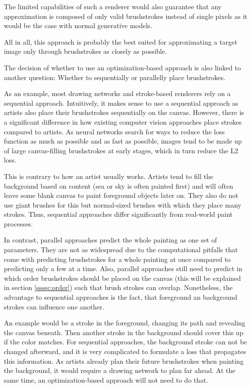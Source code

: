 The limited capabilities of such a renderer would also guarantee that any approximation is composed of only valid brushstrokes instead of single pixels as it would be the case with normal generative models.

All in all, this approach is probably the best suited for approximating a target image only through brushstrokes as closely as possible.


The decision of whether to use an optimization-based approach is also linked to another question: Whether to sequentially or parallelly place brushstrokes.

As an example, most drawing networks and stroke-based renderers rely on a sequential approach.
Intuitively, it makes sense to use a sequential approach as artists also place their brushstrokes sequentially on the canvas.
However, there is a significant difference in how existing computer vision approaches place strokes compared to artists.
As neural networks search for ways to reduce the loss function as much as possible and as fast as possible, images tend to be made up of large canvas-filling brushstrokes at early stages, which in turn reduce the L2 loss.

This is contrary to how an artist usually works.
Artists tend to fill the background based on content (\eg sea or sky is often painted first) and will often leave some blank canvas to paint foreground objects later on.
They also do not use giant brushes for this but normal-sized brushes with which they place many strokes.
Thus, sequential approaches differ significantly from real-world paint processes.

In contrast, parallel approaches predict the whole painting as one set of parameters.
They are not as widespread due to the computational pitfalls that come with predicting brushstrokes for a whole painting at once compared to predicting only a few at a time.
Also, parallel approaches still need to predict in which order brushstrokes should be placed on the canvas (this will be explained in section \ref{sssec:order}) such that brush strokes can overlap.
Nonetheless, the advantage to sequential approaches is the fact, that foreground an background strokes can influence one another.

An example would be a stroke in the foreground, changing its path and revealing the canvas beneath.
Then another stroke in the background should cover this up if the color matches.
For sequential approaches, the background stroke can not be changed afterward, and it is very complicated to formulate a loss that propagates this information.
As artists already plan their future brushstrokes when painting the background, it would require a drawing network to plan far ahead.
At the same time, an optimization-based approach will not need to do that.

